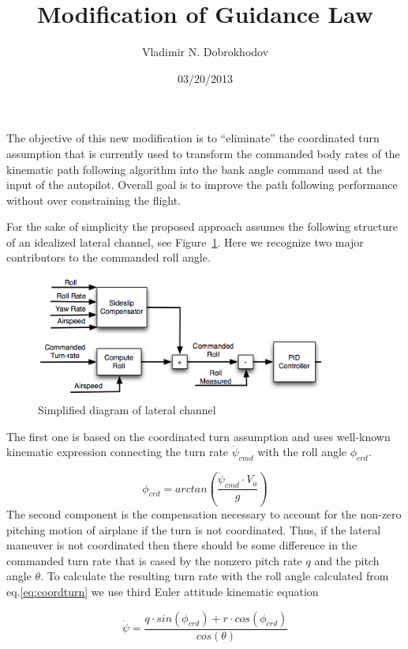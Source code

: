 \documentclass[]{article}
\begin{document}
\title{Modification of Guidance Law}
\author{Vladimir N. Dobrokhodov}
\date{03/20/2013}
\maketitle

The objective of this new modification is to ``eliminate'' the coordinated turn assumption that is currently used to transform the commanded body rates of the kinematic path following algorithm into the bank angle command used at the input of the autopilot. Overall goal is to improve the path following performance without over constraining the flight.

For the sake of simplicity the proposed approach assumes the following structure of an idealized lateral channel, see Figure~\ref{fig:LatAP}. Here we recognize two major contributors to the commanded roll angle. 
 
\begin{figure}[thpb]
      \centering
      \includegraphics[width=95mm]{APLateral.png}
      \caption{Simplified diagram of lateral channel}
      \label{fig:LatAP}
   \end{figure}
The first one is based on the coordinated turn assumption and uses well-known kinematic expression connecting the turn rate $\dot{\psi}_{cmd}$ with the roll angle $\phi_{crd}$. 

\begin{equation}
\label{eq:coordturn}
	\phi_{crd}=arctan( \frac { \dot{\psi}_{cmd} \cdot V_a} {g})	
\end{equation}
The second component is the compensation necessary to account for the non-zero pitching motion of airplane if the turn is not coordinated. Thus, if the lateral maneuver is not coordinated then there should be some difference in the commanded turn rate that is cased by the nonzero pitch rate $q$ and the pitch angle $\theta$. To calculate the resulting turn rate with the roll angle calculated from eq.\ref{eq:coordturn} we use third Euler attitude kinematic equation

\begin{equation}
\label{eq:psidot}
	\dot{\psi}=\frac {q \cdot sin(\phi_{crd})+ r \cdot cos(\phi_{crd})} {cos(\theta)}	
\end{equation}
\end{document}
